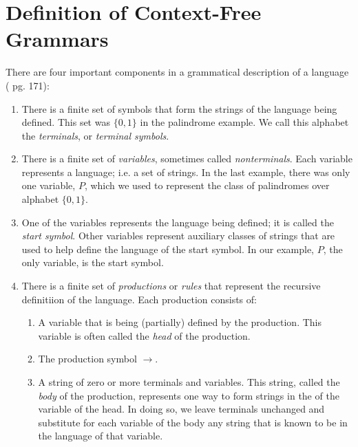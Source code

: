 \documentclass[a4paper,oneside,11pt]{book}
\theoremstyle{definition}
\begin{document}
\section{Definition of Context-Free Grammars}

There are four important components in a grammatical description of a language (\cite{AUTOMATA} pg. 171):

\begin{enumerate}

\item
There is a finite set of symbols that form the strings of the language being defined. This set was $\{0, 1\}$ in the palindrome example.
We call this alphabet the \emph{terminals}, or \emph{terminal symbols}.

\item
There is a finite set of \emph{variables}, sometimes called \emph{nonterminals}. Each variable represents a language; i.e. a set of strings.
In the last example, there was only one variable, $P$, which we used to represent the class of palindromes over alphabet $\{0, 1\}$.

\item
One of the variables represents the language being defined; it is called the \emph{start symbol}. Other variables represent auxiliary classes of
strings that are used to help define the language of the start symbol. In our example, $P$, the only variable, is the start symbol.

\item
There is a finite set of \emph{productions} or \emph{rules} that represent the recursive definitiion of the language.
Each production consists of:
\begin{enumerate}
\item
A variable that is being (partially) defined by the production. This variable is often called the \emph{head} of the production.

\item
The production symbol $\rightarrow$.

\item
A string of zero or more terminals and variables. This string, called the \emph{body} of the production,
represents one way to form strings in the of the variable of the head. In doing so, we leave terminals unchanged and substitute for each variable
of the body any string that is known to be in the language of that variable.
\end{enumerate}
\end{enumerate}
\end{document}
